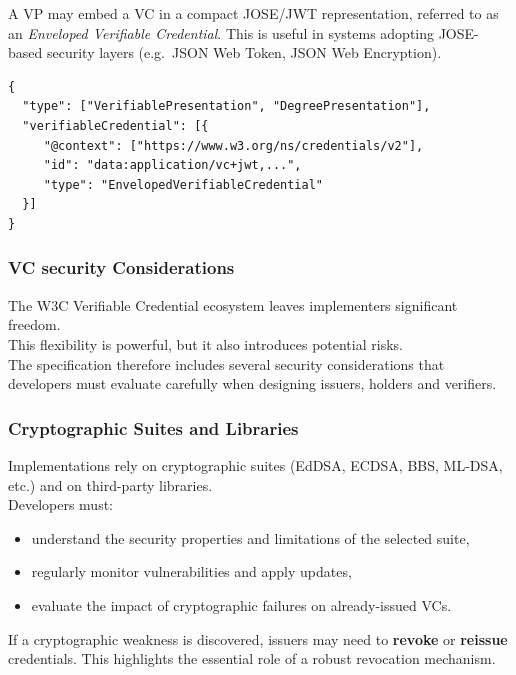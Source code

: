 A VP may embed a VC in a compact JOSE/JWT representation, referred to as an
\textit{Enveloped Verifiable Credential}.  
This is useful in systems adopting JOSE-based security layers (e.g.\ JSON Web Token,
JSON Web Encryption).

\begin{verbatim}
{
  "type": ["VerifiablePresentation", "DegreePresentation"],
  "verifiableCredential": [{
     "@context": ["https://www.w3.org/ns/credentials/v2"],
     "id": "data:application/vc+jwt,...",
     "type": "EnvelopedVerifiableCredential"
  }]
}
\end{verbatim}





\subsubsection{VC security Considerations}

The W3C Verifiable Credential ecosystem leaves implementers significant
freedom.\\
This flexibility is powerful, but it also introduces potential risks.\\  
The specification therefore includes several security considerations that
developers must evaluate carefully when designing issuers, holders and verifiers.

\vspace{0.4cm}
\subsubsection*{Cryptographic Suites and Libraries}

Implementations rely on cryptographic suites (EdDSA, ECDSA, BBS, ML-DSA,
etc.) and on third-party libraries. \\ 
Developers must:
\begin{itemize}
    \item understand the security properties and limitations of the selected suite,
    \item regularly monitor vulnerabilities and apply updates,
    \item evaluate the impact of cryptographic failures on already-issued VCs.
\end{itemize}

\noindent
If a cryptographic weakness is discovered, issuers may need to \textbf{revoke} or
\textbf{reissue} credentials.  
This highlights the essential role of a robust revocation mechanism.

